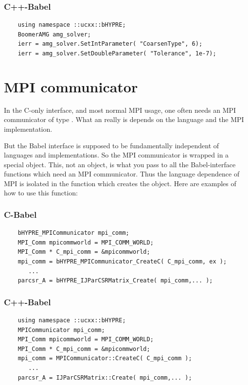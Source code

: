 \subsubsection{C++-Babel}
\begin{verbatim}
    using namespace ::ucxx::bHYPRE;
    BoomerAMG amg_solver;
    ierr = amg_solver.SetIntParameter( "CoarsenType", 6);
    ierr = amg_solver.SetDoubleParameter( "Tolerance", 1e-7);
\end{verbatim}

\section{MPI communicator}
\label{sec-MPI}

In the C-only \hypre{} interface, and most normal MPI usage, one often
needs an MPI communicator of type .  What an
 really is depends on the language and the MPI
implementation.

But the Babel interface is supposed to be fundamentally independent of
languages and implementations.  So the MPI communicator is wrapped in
a special  object.  This, not an
 object, is what you pass to all the Babel-interface
functions which need an MPI communicator.  Thus the language
dependence of MPI is isolated in the function which creates the
 object.  Here are examples of how to use
this function:

\subsubsection{C-Babel}
\begin{verbatim}
    bHYPRE_MPICommunicator mpi_comm;
    MPI_Comm mpicommworld = MPI_COMM_WORLD;
    MPI_Comm * C_mpi_comm = &mpicommworld;
    mpi_comm = bHYPRE_MPICommunicator_CreateC( C_mpi_comm, ex );
       ...
    parcsr_A = bHYPRE_IJParCSRMatrix_Create( mpi_comm,... );
\end{verbatim}

\subsubsection{C++-Babel}
\begin{verbatim}
    using namespace ::ucxx::bHYPRE;
    MPICommunicator mpi_comm;
    MPI_Comm mpicommworld = MPI_COMM_WORLD;
    MPI_Comm * C_mpi_comm = &mpicommworld;
    mpi_comm = MPICommunicator::CreateC( C_mpi_comm );
       ...
    parcsr_A = IJParCSRMatrix::Create( mpi_comm,... );
\end{verbatim}

